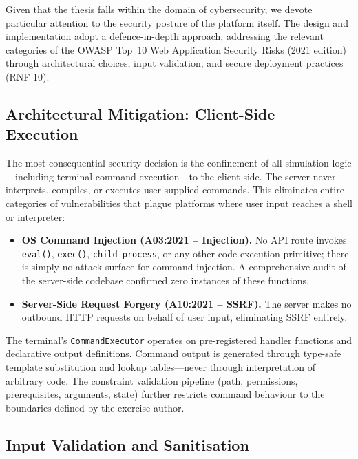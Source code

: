 Given that the thesis falls within the domain of cybersecurity, we devote particular attention to the security posture of the platform itself. The design and implementation adopt a defence-in-depth approach, addressing the relevant categories of the OWASP Top~10 Web Application Security Risks (2021 edition)~\cite{owasptop10} through architectural choices, input validation, and secure deployment practices (RNF-10).

\subsection{Architectural Mitigation: Client-Side Execution}\label{subsec:sec-clientside}

The most consequential security decision is the confinement of all simulation logic---including terminal command execution---to the client side. The server never interprets, compiles, or executes user-supplied commands. This eliminates entire categories of vulnerabilities that plague platforms where user input reaches a shell or interpreter:

\begin{itemize}
    \item \textbf{OS Command Injection (A03:2021 -- Injection).} No API route invokes \texttt{eval()}, \texttt{exec()}, \texttt{child\_process}, or any other code execution primitive; there is simply no attack surface for command injection. A comprehensive audit of the server-side codebase confirmed zero instances of these functions.
    \item \textbf{Server-Side Request Forgery (A10:2021 -- SSRF).} The server makes no outbound HTTP requests on behalf of user input, eliminating SSRF entirely.
\end{itemize}

The terminal's \texttt{CommandExecutor} operates on pre-registered handler functions and declarative output definitions. Command output is generated through type-safe template substitution and lookup tables---never through interpretation of arbitrary code. The constraint validation pipeline (path, permissions, prerequisites, arguments, state) further restricts command behaviour to the boundaries defined by the exercise author.

\subsection{Input Validation and Sanitisation}\label{subsec:sec-input}

